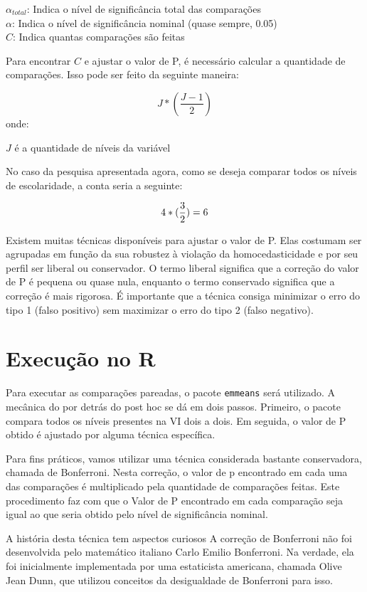\documentclass[
]{book}
\begin{document}
\(\alpha_{total}\): Indica o nível de significância total das
comparações\\
\(\alpha\): Indica o nível de significância nominal (quase sempre,
0.05)\\
\(C\): Indica quantas comparações são feitas

Para encontrar \(C\) e ajustar o valor de P, é necessário calcular a
quantidade de comparações. Isso pode ser feito da seguinte maneira:

\[J*(\frac{J-1}2)\] onde:

\(J\) é a quantidade de níveis da variável

No caso da pesquisa apresentada agora, como se deseja comparar todos os
níveis de escolaridade, a conta seria a seguinte:

\[4*(\frac{3}{2})\\=6\]

Existem muitas técnicas disponíveis para ajustar o valor de P. Elas
costumam ser agrupadas em função da sua robustez à violação da
homocedasticidade e por seu perfil ser liberal ou conservador. O termo
liberal significa que a correção do valor de P é pequena ou quase nula,
enquanto o termo conservado significa que a correção é mais rigorosa. É
importante que a técnica consiga minimizar o erro do tipo 1 (falso
positivo) sem maximizar o erro do tipo 2 (falso negativo).

\hypertarget{execuuxe7uxe3o-no-r-6}{%
\section{Execução no R}\label{execuuxe7uxe3o-no-r-6}}

Para executar as comparações pareadas, o pacote \texttt{emmeans} será
utilizado. A mecânica do por detrás do post hoc se dá em dois passos.
Primeiro, o pacote compara todos os níveis presentes na VI dois a dois.
Em seguida, o valor de P obtido é ajustado por alguma técnica
específica.

Para fins práticos, vamos utilizar uma técnica considerada bastante
conservadora, chamada de Bonferroni. Nesta correção, o valor de p
encontrado em cada uma das comparações é multiplicado pela quantidade de
comparações feitas. Este procedimento faz com que o Valor de P
encontrado em cada comparação seja igual ao que seria obtido pelo nível
de significância nominal.

A história desta técnica tem aspectos curiosos A correção de Bonferroni
não foi desenvolvida pelo matemático italiano Carlo Emilio Bonferroni.
Na verdade, ela foi inicialmente implementada por uma estaticista
americana, chamada Olive Jean Dunn, que utilizou conceitos da
desigualdade de Bonferroni para isso.
\end{document}

